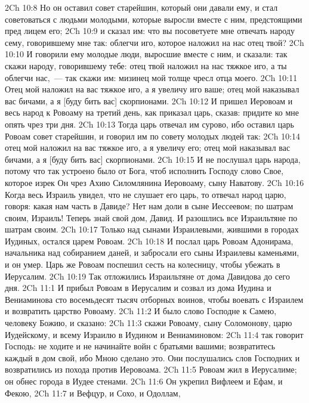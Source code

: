 \vs 2Ch 10:8 Но он оставил совет старейшин, который они давали ему, и стал советоваться с людьми молодыми, которые выросли вместе с ним, предстоящими пред лицем его;
\vs 2Ch 10:9 и сказал им: что вы посоветуете мне отвечать народу сему, говорившему мне так: облегчи иго, которое наложил на нас отец твой?
\vs 2Ch 10:10 И говорили ему молодые люди, выросшие вместе с ним, и сказали: так скажи народу, говорившему тебе: отец твой наложил на нас тяжкое иго, а ты облегчи нас,~--- так скажи им: мизинец мой толще чресл отца моего.
\vs 2Ch 10:11 Отец мой наложил на вас тяжкое иго, а я увеличу иго ваше; отец мой наказывал вас бичами, а я [буду бить вас] скорпионами.
\rsbpar\vs 2Ch 10:12 И пришел Иеровоам и весь народ к Ровоаму на третий день, как приказал царь, сказав: придите ко мне опять чрез три дня.
\vs 2Ch 10:13 Тогда царь отвечал им сурово, ибо оставил царь Ровоам совет старейшин, и говорил им по совету молодых людей так:
\vs 2Ch 10:14 отец мой наложил на вас тяжкое иго, а я увеличу его; отец мой наказывал вас бичами, а я [буду бить вас] скорпионами.
\vs 2Ch 10:15 И не послушал царь народа, потому что так устроено было от Бога, чтоб исполнить Господу слово Свое, которое изрек Он чрез Ахию Силомлянина Иеровоаму, сыну Наватову.
\rsbpar\vs 2Ch 10:16 Когда весь Израиль увидел, что не слушает его царь, то отвечал народ царю, говоря: какая нам часть в Давиде? Нет нам доли в сыне Иессеевом; по шатрам своим, Израиль! Теперь знай свой дом, Давид. И разошлись все Израильтяне по шатрам своим.
\vs 2Ch 10:17 Только над сынами Израилевыми, жившими в городах Иудиных, остался царем Ровоам.
\vs 2Ch 10:18 И послал царь Ровоам Адонирама, начальника над собиранием даней, и забросали его сыны Израилевы каменьями, и он умер. Царь же Ровоам поспешил сесть на колесницу, чтобы убежать в Иерусалим.
\vs 2Ch 10:19 Так отложились Израильтяне от дома Давидова до сего дня.
\vs 2Ch 11:1 И прибыл Ровоам в Иерусалим и созвал из дома Иудина и Вениаминова сто восемьдесят тысяч отборных воинов, чтобы воевать с Израилем и возвратить царство Ровоаму.
\vs 2Ch 11:2 И было слово Господне к Самею, человеку Божию, и сказано:
\vs 2Ch 11:3 скажи Ровоаму, сыну Соломонову, царю Иудейскому, и всему Израилю в  Иудином и Вениаминовом:
\vs 2Ch 11:4 так говорит Господь: не ходите и не начинайте войн с братьями вашими; возвратитесь каждый в дом свой, ибо Мною сделано это. Они послушались слов Господних и возвратились из похода против Иеровоама.
\rsbpar\vs 2Ch 11:5 Ровоам жил в Иерусалиме; он обнес города в Иудее стенами.
\vs 2Ch 11:6 Он укрепил Вифлеем и Ефам, и Фекою,
\vs 2Ch 11:7 и Вефцур, и Сохо, и Одоллам,
